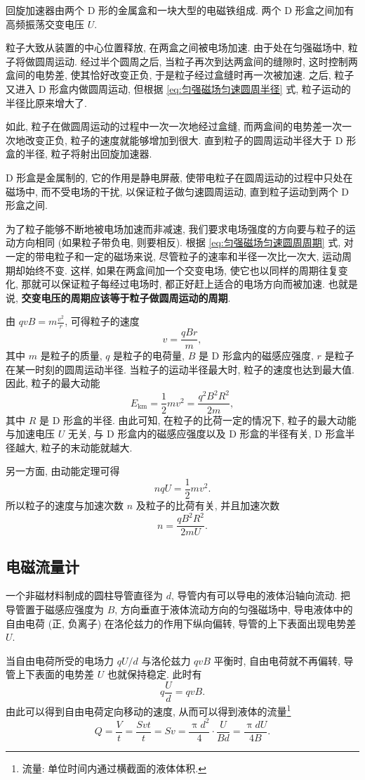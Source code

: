 \documentclass[UTF8,openany,fontset=fandol]{ctexbook}
\theoremstyle{chinesetextbook}
\begin{document}
回旋加速器由两个 D 形的金属盒和一块大型的电磁铁组成. 两个 D 形盒之间加有高频振荡交变电压 $U$.

粒子大致从装置的中心位置释放, 在两盒之间被电场加速. 由于处在匀强磁场中, 粒子将做圆周运动. 经过半个圆周之后, 当粒子再次到达两盒间的缝隙时, 这时控制两盒间的电势差, 使其恰好改变正负, 于是粒子经过盒缝时再一次被加速. 之后, 粒子又进入 D 形盒内做圆周运动, 但根据 \eqref{eq:匀强磁场匀速圆周半径} 式, 粒子运动的半径比原来增大了.

如此, 粒子在做圆周运动的过程中一次一次地经过盒缝, 而两盒间的电势差一次一次地改变正负, 粒子的速度就能够增加到很大. 直到粒子的圆周运动半径大于 D 形盒的半径, 粒子将射出回旋加速器.

D 形盒是金属制的, 它的作用是静电屏蔽, 使带电粒子在圆周运动的过程中只处在磁场中, 而不受电场的干扰, 以保证粒子做匀速圆周运动, 直到粒子运动到两个 D 形盒之间.

为了粒子能够不断地被电场加速而非减速, 我们要求电场强度的方向要与粒子的运动方向相同 (如果粒子带负电, 则要相反). 根据 \eqref{eq:匀强磁场匀速圆周周期} 式, 对一定的带电粒子和一定的磁场来说, 尽管粒子的速率和半径一次比一次大, 运动周期却始终不变. 这样, 如果在两盒间加一个交变电场, 使它也以同样的周期往复变化, 那就可以保证粒子每经过电场时, 都正好赶上适合的电场方向而被加速. 也就是说, \textbf{交变电压的周期应该等于粒子做圆周运动的周期}.

由 $\displaystyle qvB=m\frac{v^2}{r}$, 可得粒子的速度
\[
v=\frac{qBr}{m},
\]
其中 $m$ 是粒子的质量, $q$ 是粒子的电荷量, $B$ 是 D 形盒内的磁感应强度, $r$ 是粒子在某一时刻的圆周运动半径. 当粒子的运动半径最大时, 粒子的速度也达到最大值. 因此, 粒子的最大动能
\[
E_\mathrm{km}=\frac12mv^2=\frac{q^2B^2R^2}{2m},
\]
其中 $R$ 是 D 形盒的半径. 由此可知, 在粒子的比荷一定的情况下, 粒子的最大动能与加速电压 $U$ 无关, 与 D 形盒内的磁感应强度以及 D 形盒的半径有关, D 形盒半径越大, 粒子的末动能就越大.

另一方面, 由动能定理可得
\[
nqU=\frac12mv^2.
\]
所以粒子的速度与加速次数 $n$ 及粒子的比荷有关, 并且加速次数
\[
n=\frac{qB^2R^2}{2mU}.
\]
\subsection{电磁流量计}
一个非磁材料制成的圆柱导管直径为 $d$, 导管内有可以导电的液体沿轴向流动. 把导管置于磁感应强度为 $B$, 方向垂直于液体流动方向的匀强磁场中, 导电液体中的自由电荷 (正, 负离子) 在洛伦兹力的作用下纵向偏转, 导管的上下表面出现电势差 $U$.

当自由电荷所受的电场力 $qU/d$ 与洛伦兹力 $qvB$ 平衡时, 自由电荷就不再偏转, 导管上下表面的电势差 $U$ 也就保持稳定. 此时有
\[
q\frac{U}{d}=qvB.
\]
由此可以得到自由电荷定向移动的速度, 从而可以得到液体的流量\footnote{流量: 单位时间内通过横截面的液体体积.}
\[
Q=\frac{V}{t}=\frac{Svt}{t}=Sv=\frac{\uppi d^2}{4}\cdot\frac{U}{Bd}=\frac{\uppi dU}{4B}.
\]
\end{document}
